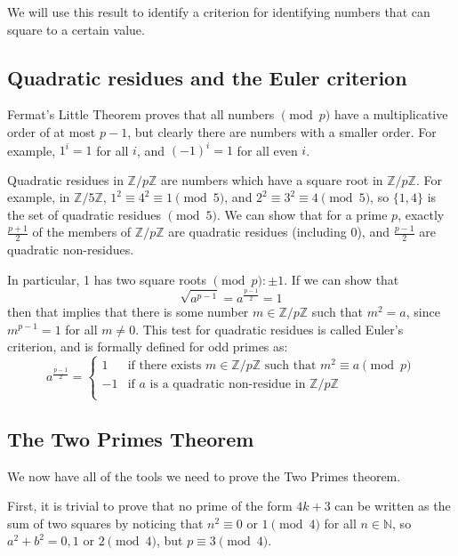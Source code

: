\documentclass{article}
\begin{document}
We will use this result to identify a criterion for identifying numbers that can square to a 
certain value.

\subsection{Quadratic residues and the Euler criterion}

Fermat's Little Theorem proves that all numbers $\pmod{p}$ have a multiplicative order of at
most $p-1$, but clearly there are numbers with a smaller order. For example, $1^i = 1$ for all
$i$, and $(-1)^i = 1$ for all even $i$.

Quadratic residues in $\mathbb{Z}/p\mathbb{Z}$ are numbers which have a square root in
$\mathbb{Z}/p\mathbb{Z}$. For example, in $\mathbb{Z}/5\mathbb{Z}$, $1^2 \equiv 4^2 \equiv 1
\pmod{5}$, and $2^2 \equiv 3^2 \equiv 4 \pmod{5}$, so $\{1,4\}$ is the set of quadratic residues
$\pmod{5}$. We can show that for a prime $p$, exactly $\frac{p+1}{2}$ of the members of
$\mathbb{Z}/p\mathbb{Z}$ are quadratic residues (including 0), and $\frac{p-1}{2}$ are quadratic
non-residues.

In particular, 1 has two square roots $\pmod{p}: \pm 1$. If we can show that 
\[\sqrt{a^{p-1}} = a^{\frac{p-1}{2}} = 1\]
then that implies that there is some number $m \in \mathbb{Z}/p\mathbb{Z}$ such that $m^2 = a$,
since $m^{p-1} = 1$ for all $m \neq 0$. This test for quadratic residues is called Euler's
criterion, and is formally defined for odd primes as:
\[a^{\frac{p-1}{2}} =
\left\{
	\begin{array}{ll}
		1  & \mbox{if there exists } m \in \mathbb{Z}/p\mathbb{Z} \mbox{ such that } m^2 \equiv a \pmod{p} \\
		-1  & \mbox{if } a \mbox{ is a quadratic non-residue in } \mathbb{Z}/p\mathbb{Z} \\
	\end{array}
\right. \]

\subsection{The Two Primes Theorem}

We now have all of the tools we need to prove the Two Primes theorem.

First, it is trivial to prove that no prime of the form $4k+3$ can be written as the sum of two
squares by noticing that $n^2 \equiv 0 \mbox{ or } 1 \pmod{4}$ for all $n\in \mathbb{N}$, so 
$a^2+b^2 = 0,1 \mbox{ or } 2 \pmod{4}$, but $p \equiv 3 \pmod{4}$.
\end{document}
